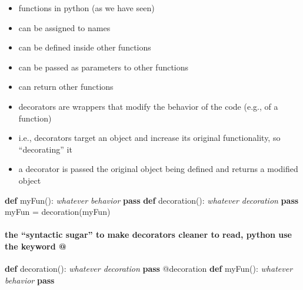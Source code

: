 \documentclass[11pt]{article}
\providecommand{\tightlist}{%
      \setlength{\itemsep}{0pt}\setlength{\parskip}{0pt}}
\newenvironment{Shaded}{}{}
\newcommand{\KeywordTok}[1]{\textcolor[rgb]{0.00,0.44,0.13}{\textbf{{#1}}}}
\newcommand{\CommentTok}[1]{\textcolor[rgb]{0.38,0.63,0.69}{\textit{{#1}}}}
\newcommand{\NormalTok}[1]{{#1}}
\newcommand{\ControlFlowTok}[1]{\textcolor[rgb]{0.00,0.44,0.13}{\textbf{{#1}}}}
\newcommand{\OperatorTok}[1]{\textcolor[rgb]{0.40,0.40,0.40}{{#1}}}
\newcommand{\AttributeTok}[1]{\textcolor[rgb]{0.49,0.56,0.16}{{#1}}}
\begin{document}
\begin{itemize}
\tightlist
\item
  functions in python (as we have seen)
\item
  can be assigned to names
\item
  can be defined inside other functions
\item
  can be passed as parameters to other functions
\item
  can return other functions
\item
  decorators are wrappers that modify the behavior of the code (e.g., of
  a function)
\item
  i.e., decorators target an object and increase its original
  functionality, so ``decorating'' it
\item
  a decorator is passed the original object being defined and returns a
  modified object
\end{itemize}

\begin{Shaded}
\begin{Highlighting}[]
\KeywordTok{def}\NormalTok{ myFun():  }
    \CommentTok{\textquotesingle{}\textquotesingle{}\textquotesingle{}whatever behavior\textquotesingle{}\textquotesingle{}\textquotesingle{}}
    \ControlFlowTok{pass}
\KeywordTok{def}\NormalTok{ decoration():  }
    \CommentTok{\textquotesingle{}\textquotesingle{}\textquotesingle{}whatever decoration\textquotesingle{}\textquotesingle{}\textquotesingle{}}
    \ControlFlowTok{pass}
\NormalTok{myFun }\OperatorTok{=}\NormalTok{ decoration(myFun)}
\end{Highlighting}
\end{Shaded}

\hypertarget{the-syntactic-sugar-to-make-decorators-cleaner-to-read-python-use-the-keyword}{%
\paragraph{the ``syntactic sugar'' to make decorators cleaner to read,
python use the keyword
@}\label{the-syntactic-sugar-to-make-decorators-cleaner-to-read-python-use-the-keyword}}

\begin{Shaded}
\begin{Highlighting}[]
\KeywordTok{def}\NormalTok{ decoration():  }
    \CommentTok{\textquotesingle{}\textquotesingle{}\textquotesingle{}whatever decoration\textquotesingle{}\textquotesingle{}\textquotesingle{}}
    \ControlFlowTok{pass}
\AttributeTok{@decoration}
\KeywordTok{def}\NormalTok{ myFun():  }
    \CommentTok{\textquotesingle{}\textquotesingle{}\textquotesingle{}whatever behavior\textquotesingle{}\textquotesingle{}\textquotesingle{}}
    \ControlFlowTok{pass}    
\end{Highlighting}
\end{Shaded}
\end{document}
